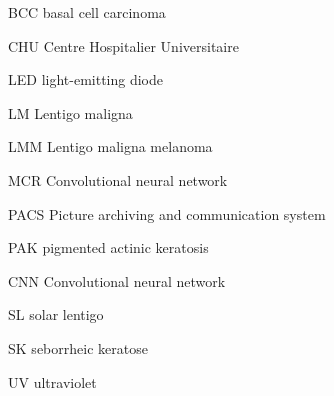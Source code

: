 
            {BCC}
            {basal cell carcinoma}
            
            {CHU}
            {Centre Hospitalier Universitaire}
            
            {LED}
            {light-emitting diode}
            
            {LM}
            {Lentigo maligna}
            
            {LMM}
            {Lentigo maligna melanoma}
            
            {MCR}
            {Convolutional neural network}

            {PACS}
            {Picture archiving and communication system}
         
            {PAK}
            {pigmented actinic keratosis}
            
            {CNN}
            {Convolutional neural network}
            
            {SL}
            {solar lentigo}
            
            {SK}
            {seborrheic keratose}
            
            {UV}
            {ultraviolet}
